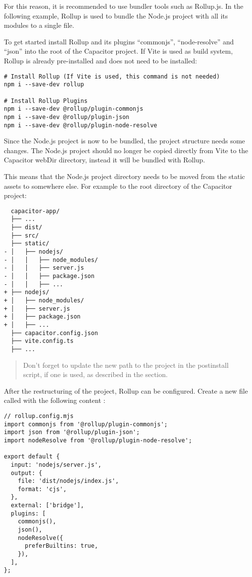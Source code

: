 For this reason, it is recommended to use bundler tools such as Rollup.js.
In the following example, Rollup is used to bundle the Node.js project with all its modules to a single file.
\cite{rollup, rollup-plugins}

To get started install Rollup and its plugins \enquote{commonjs}, \enquote{node-resolve} and \enquote{json} into the root of the Capacitor project.
If Vite is used as build system, Rollup is already pre-installed and does not need to be installed:

\begin{verbatim}
# Install Rollup (If Vite is used, this command is not needed)
npm i --save-dev rollup

# Install Rollup Plugins
npm i --save-dev @rollup/plugin-commonjs
npm i --save-dev @rollup/plugin-json
npm i --save-dev @rollup/plugin-node-resolve
\end{verbatim}

Since the Node.js project is now to be bundled, the project structure needs some changes.
The Node.js project should no longer be copied directly from Vite to the Capacitor webDir directory, instead it will be bundled with Rollup.

This means that the Node.js project directory needs to be moved from the static assets to somewhere else.
For example to the root directory of the Capacitor project:

\begin{verbatim}
  capacitor-app/
  ├── ...
  ├── dist/
  ├── src/
  ├── static/
- │   ├── nodejs/
- │   │   ├── node_modules/
- │   │   ├── server.js
- │   │   ├── package.json
- │   │   ├── ...
+ ├── nodejs/
+ │   ├── node_modules/
+ │   ├── server.js
+ │   ├── package.json
+ │   ├── ...
  ├── capacitor.config.json
  ├── vite.config.ts
  ├── ... 
\end{verbatim}

\begin{quote}
  Don't forget to update the new path to the project in the postinstall script,
  if one is used, as described in the  section.
\end{quote}

\newpage

After the restructuring of the project, Rollup can be configured.
Create a new file called  with the following content \cite{rollup, rollup-plugins}:

\begin{verbatim}
// rollup.config.mjs
import commonjs from '@rollup/plugin-commonjs';
import json from '@rollup/plugin-json';
import nodeResolve from '@rollup/plugin-node-resolve';

export default {
  input: 'nodejs/server.js',
  output: {
    file: 'dist/nodejs/index.js',
    format: 'cjs',
  },
  external: ['bridge'],
  plugins: [
    commonjs(),
    json(),
    nodeResolve({
      preferBuiltins: true,
    }),
  ],
}; 
\end{verbatim}

